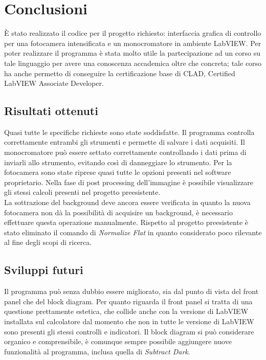 \chapter{Conclusioni}
\thispagestyle{empty}

È stato realizzato il codice per il progetto richiesto: interfaccia grafica di controllo per una fotocamera intensificata e un monocromatore in ambiente LabVIEW. Per poter realizzare il programma è stata molto utile la partecipazione ad un corso su tale linguaggio per avere una conoscenza accademica oltre che concreta; tale corso ha anche permetto di conseguire la certificazione base di CLAD, Certified LabVIEW Associate Developer. 

\section{Risultati ottenuti}
Quasi tutte le specifiche richieste sono state soddisfatte. Il programma controlla correttamente entrambi gli strumenti e permette di salvare i dati acquisiti. Il monocromatore può essere settato correttamente controllando i dati prima di inviarli allo strumento, evitando così di danneggiare lo strumento. Per la fotocamera sono state riprese quasi tutte le opzioni presenti nel software proprietario. Nella fase di post processing dell'immagine è possibile visualizzare gli stessi calcoli presenti nel progetto preesistente.\\
La sottrazione del background deve ancora essere verificata in quanto la nuova fotocamera non dà la possibilità di acquisire un background, è necessario effettuare questa operazione manualmente. Rispetto al progetto preesistente è stato eliminato il comando di \textit{Normalize Flat} in quanto considerato poco rilevante al fine degli scopi di ricerca.

\section{Sviluppi futuri}
Il programma può senza dubbio essere migliorato, sia dal punto di vista del front panel che del block diagram. Per quanto riguarda il front panel si tratta di una questione prettamente estetica, che collide anche con la versione di LabVIEW installata sul calcolatore dal momento che non in tutte le versione di LabVIEW sono presenti gli stessi controlli e indicatori. Il block diagram si può considerare organico e comprensibile, è comunque sempre possibile aggiungere nuove funzionalità al programma, inclusa quella di \textit{Subtract Dark}. 